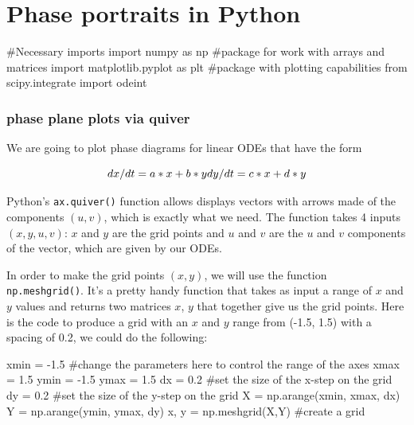 \documentclass[
  letterpaper,
  DIV=11,
  numbers=noendperiod]{scrreprt}
\newenvironment{Shaded}{\begin{snugshade}}{\end{snugshade}}
\newcommand{\CommentTok}[1]{\textcolor[rgb]{0.37,0.37,0.37}{#1}}
\newcommand{\FloatTok}[1]{\textcolor[rgb]{0.68,0.00,0.00}{#1}}
\newcommand{\ImportTok}[1]{\textcolor[rgb]{0.00,0.46,0.62}{#1}}
\newcommand{\NormalTok}[1]{\textcolor[rgb]{0.00,0.23,0.31}{#1}}
\newcommand{\OperatorTok}[1]{\textcolor[rgb]{0.37,0.37,0.37}{#1}}
\begin{document}

\hypertarget{phase-portraits-in-python}{%
\chapter{Phase portraits in Python}\label{phase-portraits-in-python}}

\begin{Shaded}
\begin{Highlighting}[]
\CommentTok{\#Necessary imports}
\ImportTok{import}\NormalTok{ numpy }\ImportTok{as}\NormalTok{ np }\CommentTok{\#package for work with arrays and matrices}
\ImportTok{import}\NormalTok{ matplotlib.pyplot }\ImportTok{as}\NormalTok{ plt }\CommentTok{\#package with plotting capabilities}
\ImportTok{from}\NormalTok{ scipy.integrate }\ImportTok{import}\NormalTok{ odeint}
\end{Highlighting}
\end{Shaded}

\hypertarget{phase-plane-plots-via-quiver}{%
\subsection{phase plane plots via
quiver}\label{phase-plane-plots-via-quiver}}

We are going to plot phase diagrams for linear ODEs that have the form

\[
dx/dt = a*x + b*y \\
dy/dt = c*x + d*y
\]

Python's \texttt{ax.quiver()} function allows displays vectors with
arrows made of the components \((u,v)\), which is exactly what we need.
The function takes 4 inputs \((x,y,u,v)\): \(x\) and \(y\) are the grid
points and \(u\) and \(v\) are the \(u\) and \(v\) components of the
vector, which are given by our ODEs.

In order to make the grid points \((x,y)\), we will use the function
\texttt{np.meshgrid()}. It's a pretty handy function that takes as input
a range of \(x\) and \(y\) values and returns two matrices \(x\), \(y\)
that together give us the grid points. Here is the code to produce a
grid with an \(x\) and \(y\) range from (-1.5, 1.5) with a spacing of
0.2, we could do the following:

\begin{Shaded}
\begin{Highlighting}[]
\NormalTok{xmin }\OperatorTok{=} \OperatorTok{{-}}\FloatTok{1.5} \CommentTok{\#change the parameters here to control the range of the axes}
\NormalTok{xmax }\OperatorTok{=} \FloatTok{1.5}
\NormalTok{ymin }\OperatorTok{=} \OperatorTok{{-}}\FloatTok{1.5}
\NormalTok{ymax }\OperatorTok{=} \FloatTok{1.5}
\NormalTok{dx }\OperatorTok{=} \FloatTok{0.2} \CommentTok{\#set the size of the x{-}step on the grid}
\NormalTok{dy }\OperatorTok{=} \FloatTok{0.2} \CommentTok{\#set the size of the y{-}step on the grid}
\NormalTok{X }\OperatorTok{=}\NormalTok{ np.arange(xmin, xmax, dx)}
\NormalTok{Y }\OperatorTok{=}\NormalTok{ np.arange(ymin, ymax, dy)}
\NormalTok{x, y }\OperatorTok{=}\NormalTok{ np.meshgrid(X,Y) }\CommentTok{\#create a grid}
\end{Highlighting}
\end{Shaded}
\end{document}
